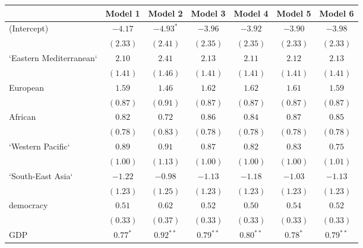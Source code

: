 
\begin{table}[!h]
\begin{center}
\begin{tabular}{l c c c c c c }
\toprule
 & Model 1 & Model 2 & Model 3 & Model 4 & Model 5 & Model 6 \\
\midrule
(Intercept)             & $-4.17$      & $-4.93^{*}$  & $-3.96$      & $-3.92$      & $-3.90$      & $-3.98$      \\
                        & $(2.33)$     & $(2.41)$     & $(2.35)$     & $(2.35)$     & $(2.33)$     & $(2.33)$     \\
`Eastern Mediterranean` & $2.10$       & $2.41$       & $2.13$       & $2.11$       & $2.12$       & $2.13$       \\
                        & $(1.41)$     & $(1.46)$     & $(1.41)$     & $(1.41)$     & $(1.41)$     & $(1.41)$     \\
European                & $1.59$       & $1.46$       & $1.62$       & $1.62$       & $1.61$       & $1.59$       \\
                        & $(0.87)$     & $(0.91)$     & $(0.87)$     & $(0.87)$     & $(0.87)$     & $(0.87)$     \\
African                 & $0.82$       & $0.72$       & $0.86$       & $0.84$       & $0.87$       & $0.85$       \\
                        & $(0.78)$     & $(0.83)$     & $(0.78)$     & $(0.78)$     & $(0.78)$     & $(0.78)$     \\
`Western Pacific`       & $0.89$       & $0.91$       & $0.87$       & $0.82$       & $0.83$       & $0.75$       \\
                        & $(1.00)$     & $(1.13)$     & $(1.00)$     & $(1.00)$     & $(1.00)$     & $(1.01)$     \\
`South-East Asia`       & $-1.22$      & $-0.98$      & $-1.13$      & $-1.18$      & $-1.03$      & $-1.13$      \\
                        & $(1.23)$     & $(1.25)$     & $(1.23)$     & $(1.23)$     & $(1.23)$     & $(1.23)$     \\
democracy               & $0.51$       & $0.62$       & $0.52$       & $0.50$       & $0.54$       & $0.52$       \\
                        & $(0.33)$     & $(0.37)$     & $(0.33)$     & $(0.33)$     & $(0.33)$     & $(0.33)$     \\
GDP                     & $0.77^{*}$   & $0.92^{**}$  & $0.79^{**}$  & $0.80^{**}$  & $0.78^{*}$   & $0.79^{**}$  \\

\end{tabular}
\end{center}
\end{table}
